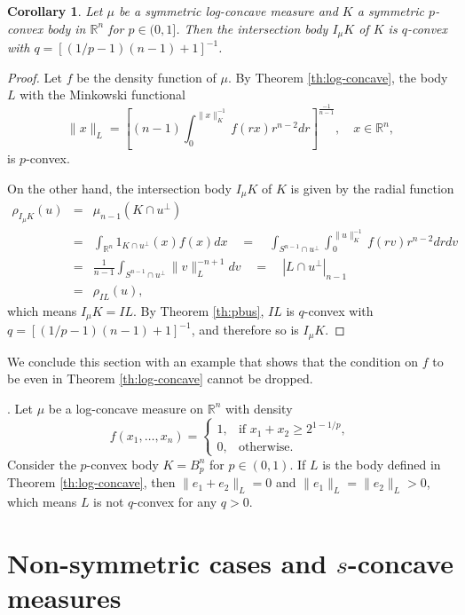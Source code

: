 \documentclass[12pt]{amsart} %
\newtheorem{corollary}{Corollary}
\renewcommand{\[}{\left[}
\renewcommand{\(}{\left(}
\renewcommand{\]}{\right]}
\renewcommand{\)}{\right)}
\renewcommand{\ge}{\geqslant}
\newcommand{\R}{\mathbb R}              %
\begin{document}
\begin{corollary}
Let $\mu$ be a symmetric log-concave measure and $K$ a symmetric $p$-convex body in $\R^n$ for $p \in (0,1]$. Then the intersection body $I_\mu K$ of $K$ is $q$-convex with $q =\left[(1/p-1)(n-1) + 1 \right]^{-1}$.
\end{corollary}

\begin{proof}
Let $f$ be the density function of $\mu$. By Theorem \ref{th:log-concave}, the body $L$ with the Minkowski functional
$$
\|x\|_L = \left[(n-1)\int_0^{\|x\|_K^{-1}} f(rx)r^{n-2}dr\right]^{\frac{-1}{n-1}},\quad x\in\R^n,
$$
is $p$-convex.


On the other hand, the intersection body $I_\mu K$ of $K$ is given by the radial function
\begin{eqnarray*}
\rho_{I_\mu K}(u) &=& \mu_{n-1}(K\cap u^\bot)  \\
&=& \int_{\R^n} 1_{K\cap u^\bot}(x)f(x) dx \quad=\quad \int_{S^{n-1}\cap u^\bot} \int_0^{\|u\|_K^{-1}}f(rv)r^{n-2} drdv \\
&=& \frac{1}{n-1}\int_{S^{n-1}\cap u^\bot} \|v\|_L^{-n+1}dv \quad=\quad |L\cap u^\bot|_{n-1} \\ &=& \rho_{IL}(u),
\end{eqnarray*}
which means $I_\mu K = IL$. By Theorem \ref{th:pbus}, $IL$ is $q$-convex with $q =\left[ (1/p-1)(n-1) +1 \right]^{-1}$, and therefore so is $I_\mu K$.

\end{proof}

We conclude this section with an example that shows that  the condition on $f$ to be even in Theorem \ref{th:log-concave} cannot be dropped.

.
Let $\mu$ be a log-concave measure on $\R^n$ with density
$$f(x_1,\ldots,x_n)=\left\{\begin{array}{ll} 1, &\text{if }x_1+x_2 \ge 2^{1-1/p},\\
0, &\text{otherwise.}\end{array}
\right.$$  Consider the $p$-convex body $K=B_p^n$ for $p\in(0,1)$. If $L$ is the body defined in Theorem \ref{th:log-concave}, then  $\|e_1+e_2\|_L=0$ and $\|e_1\|_L=\|e_2\|_L>0$, which means $L$ is not $q$-convex for any $q>0$.\\


\section{Non-symmetric cases and $s$-concave measures}
\end{document}
